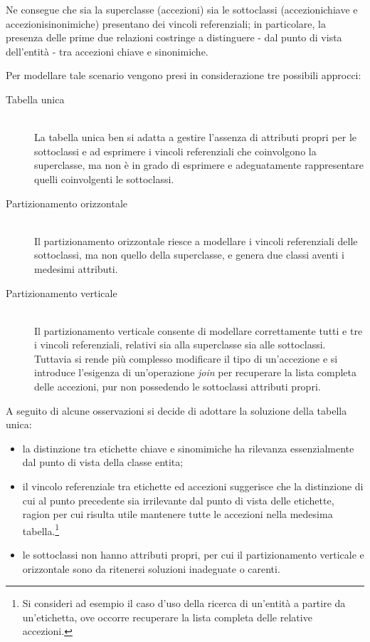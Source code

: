Ne consegue che sia la superclasse (\textsf{accezioni}) sia le sottoclassi (\textsf{accezioni\textunderscore chiave} e \textsf{accezioni\textunderscore sinonimiche}) presentano dei vincoli referenziali; in particolare, la presenza delle prime due relazioni costringe a distinguere - dal punto di vista dell'entità - tra accezioni chiave e sinonimiche.

Per modellare tale scenario vengono presi in considerazione tre possibili approcci:
\begin{description}
\item[Tabella unica] \hfill \\
La tabella unica ben si adatta a gestire l'assenza di attributi propri per le sottoclassi e ad esprimere i vincoli referenziali che coinvolgono la superclasse, ma non è in grado di esprimere e adeguatamente rappresentare quelli coinvolgenti le sottoclassi.
\item[Partizionamento orizzontale] \hfill \\
Il partizionamento orizzontale riesce a modellare i vincoli referenziali delle sottoclassi, ma non quello della superclasse, e genera due classi aventi i medesimi attributi.
\item[Partizionamento verticale] \hfill \\
Il partizionamento verticale consente di modellare correttamente tutti e tre i vincoli referenziali, relativi sia alla superclasse sia alle sottoclassi. Tuttavia si rende più complesso modificare il tipo di un'accezione e si introduce l'esigenza di un'operazione \textit{join} per recuperare la lista completa delle accezioni, pur non possedendo le sottoclassi attributi propri.
\end{description}

A seguito di alcune osservazioni si decide di adottare la soluzione della tabella unica:
\begin{itemize}
\item la distinzione tra etichette chiave e sinomimiche ha rilevanza essenzialmente dal punto di vista della classe \textsf{entita};
\item il vincolo referenziale tra \textsf{etichette} ed \textsf{accezioni} suggerisce che la distinzione di cui al punto precedente sia irrilevante dal punto di vista delle etichette, ragion per cui risulta utile mantenere tutte le accezioni nella medesima tabella.\footnote{Si consideri ad esempio il caso d'uso della ricerca di un'entità a partire da un'etichetta, ove occorre recuperare la lista completa delle relative accezioni.}
\item le sottoclassi non hanno attributi propri, per cui il partizionamento verticale e orizzontale sono da ritenersi soluzioni inadeguate o carenti.
\end{itemize}

